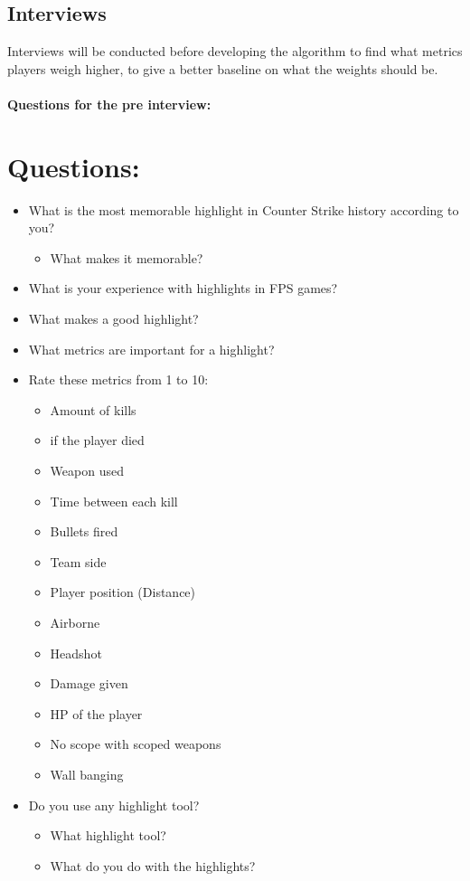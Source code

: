 \subsection{Interviews}
\label{sec:interviews}
Interviews will be conducted before developing the algorithm to find what metrics players weigh higher, to give a better baseline on what the weights should be. \\ \\
\textbf {Questions for the pre interview:}\\
\section{Questions:}
\normalsize
\begin{itemize}
    \item What is the most memorable highlight in Counter Strike history according to you? 
    \begin{itemize}
        \item What makes it memorable?
    \end{itemize}
    \item What is your experience with highlights in FPS games?
    \item What makes a good highlight?
    \item What metrics are important for a highlight?
    \item Rate these metrics from 1 to 10:
        \begin{itemize}
        \item Amount of kills 
        \item if the player died
        \item Weapon used 
        \item Time between each kill
        \item Bullets fired
        \item Team side
        \item Player position (Distance)
        \item Airborne 
        \item Headshot
        \item Damage given
        \item HP of the player
        \item No scope with scoped weapons
        \item Wall banging
    \end{itemize}
    \item Do you use any highlight tool?
    \begin{itemize}
        \item What highlight tool?
        \item What do you do with the highlights?
    \end{itemize}

    
\end{itemize}

